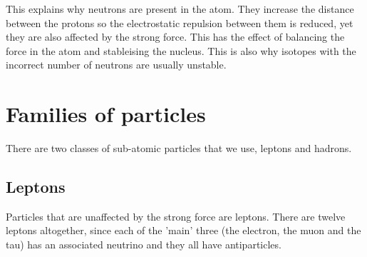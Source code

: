 \documentclass{article}
\begin{document}
This explains why neutrons are present in the atom. They increase the distance
between the protons so the electrostatic repulsion between them is reduced, yet
they are also affected by the strong force. This has the effect of balancing the
force in the atom and stableising the nucleus. This is also why isotopes with
the incorrect number of neutrons are usually unstable.

\section*{Families of particles}
There are two classes of sub-atomic particles that we use, leptons and hadrons.

\subsection*{Leptons}

Particles that are unaffected by the strong force are leptons. There are twelve
leptons altogether, since each of the 'main' three (the electron, the muon and
the tau) has an associated neutrino and they all have antiparticles.
\end{document}
